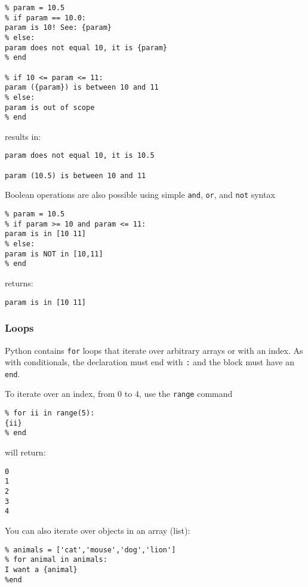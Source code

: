 \begin{verbatim}
% param = 10.5
% if param == 10.0:
param is 10! See: {param}
% else:
param does not equal 10, it is {param}
% end

% if 10 <= param <= 11:
param ({param}) is between 10 and 11
% else:
param is out of scope
% end
\end{verbatim}

results in:

\begin{verbatim}
param does not equal 10, it is 10.5

param (10.5) is between 10 and 11
\end{verbatim}

Boolean operations are also possible using simple \texttt{and},
\texttt{or}, and \texttt{not} syntax

\begin{verbatim}
% param = 10.5
% if param >= 10 and param <= 11:
param is in [10 11]
% else:
param is NOT in [10,11]
% end
\end{verbatim}

returns:

\begin{verbatim}
param is in [10 11]
\end{verbatim}

\subsubsection{Loops}\label{loops}

Python contains \texttt{for} loops that iterate over arbitrary arrays or
with an index. As with conditionals, the declaration must end with
\texttt{:} and the block must have an \texttt{end}.

To iterate over an index, from 0 to 4, use the \texttt{range} command

\begin{verbatim}
% for ii in range(5):
{ii}
% end
\end{verbatim}

will return:

\begin{verbatim}
0
1
2
3
4
\end{verbatim}

You can also iterate over objects in an array (list):

\begin{verbatim}
% animals = ['cat','mouse','dog','lion']
% for animal in animals:
I want a {animal}
%end
\end{verbatim}

